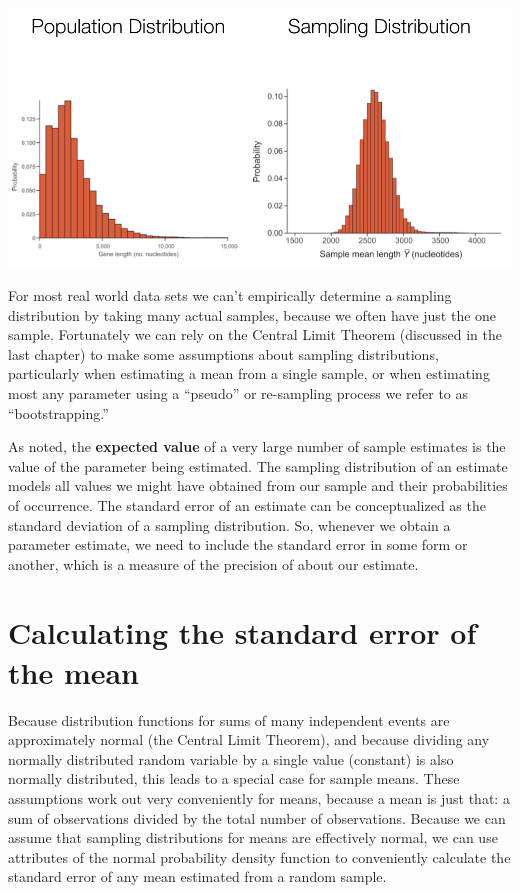 \documentclass[]{book}
\begin{document}
\begin{center}\includegraphics[width=1\linewidth]{images/week_2.025} \end{center}

For most real world data sets we can't empirically determine a sampling distribution by taking many actual samples, because we often have just the one sample. Fortunately we can rely on the Central Limit Theorem (discussed in the last chapter) to make some assumptions about sampling distributions, particularly when estimating a mean from a single sample, or when estimating most any parameter using a ``pseudo'' or re-sampling process we refer to as ``bootstrapping.''

As noted, the \textbf{expected value} of a very large number of sample estimates is the value of the parameter being estimated. The sampling distribution of an estimate models all values we might have obtained from our sample and their probabilities of occurrence. The standard error of an estimate can be conceptualized as the standard deviation of a sampling distribution. So, whenever we obtain a parameter estimate, we need to include the standard error in some form or another, which is a measure of the precision of about our estimate.

\hypertarget{calculating-the-standard-error-of-the-mean}{%
\section{Calculating the standard error of the mean}\label{calculating-the-standard-error-of-the-mean}}

Because distribution functions for sums of many independent events are approximately normal (the Central Limit Theorem), and because dividing any normally distributed random variable by a single value (constant) is also normally distributed, this leads to a special case for sample means. These assumptions work out very conveniently for means, because a mean is just that: a sum of observations divided by the total number of observations. Because we can assume that sampling distributions for means are effectively normal, we can use attributes of the normal probability density function to conveniently calculate the standard error of any mean estimated from a random sample.
\end{document}
